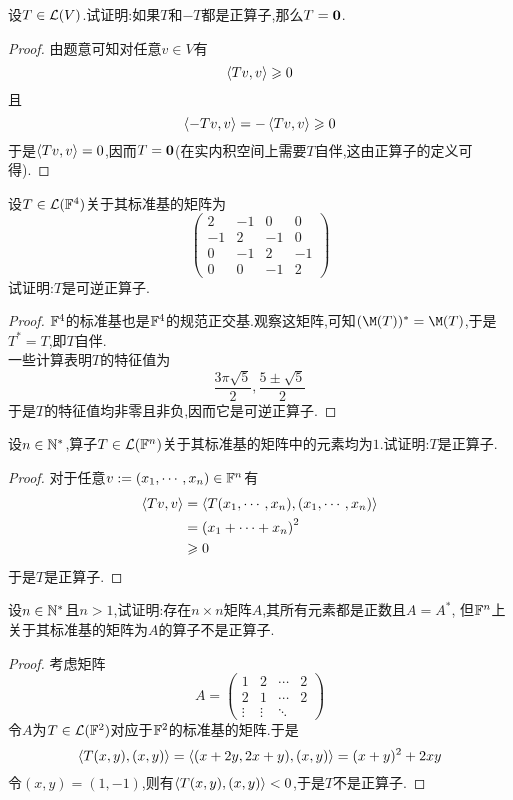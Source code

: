 \documentclass{ctexart}
\begin{document}
\pagestyle{empty}
\begin{center}
    \large{}
\end{center}
\begin{problem}[1.]
    设$T\in\mathcal{L}(V)$.试证明:如果$T$和$-T$都是正算子,那么$T=\mathbf0$.
\end{problem}
\begin{proof}
    由题意可知对任意$v\in V$有
    \[\left\langle{Tv},{v}\right\rangle\geqslant0\]
    且
    \[\left\langle{-Tv},{v}\right\rangle=-\left\langle{Tv},{v}\right\rangle\geqslant0\]
    于是$\left\langle{Tv},{v}\right\rangle=0$,因而$T=\mathbf0$(在实内积空间上需要$T$自伴,这由正算子的定义可得).
\end{proof}
\begin{problem}[2.]
    设$T\in\mathcal{L}(\mathbb{F}^4)$关于其标准基的矩阵为
    \[\begin{pmatrix}
        2&-1&0&0\\
        -1&2&-1&0\\
        0&-1&2&-1\\
        0&0&-1&2
    \end{pmatrix}\]
    试证明:$T$是可逆正算子.
\end{problem}
\begin{proof}
    $\mathbb{F}^4$的标准基也是$\mathbb{F}^4$的规范正交基.观察这矩阵,可知$(\M(T))^*=\M(T)$,于是$T^*=T$,即$T$自伴.\\
    一些计算表明$T$的特征值为
    \[\dfrac{3\pi\sqrt5}{2},\dfrac{5\pm\sqrt5}{2}\]
    于是$T$的特征值均非零且非负,因而它是可逆正算子.
\end{proof}
\begin{problem}[3.]
    设$n\in\mathbb{N}^*$,算子$T\in\mathcal{L}(\mathbb{F}^n)$关于其标准基的矩阵中的元素均为$1$.试证明:$T$是正算子.
\end{problem}
\begin{proof}
    对于任意$v:=({x}_1,\cdots,{x}_{n})\in\mathbb{F}^n$有
    \[\begin{aligned}
        \left\langle{Tv},{v}\right\rangle
        &= \left\langle{T({x}_1,\cdots,{x}_{n})},{({x}_1,\cdots,{x}_{n})}\right\rangle \\
        &= \left({x}_1+\cdots+{x}_{n}\right)^2 \\
        &\geqslant 0
    \end{aligned}\]
    于是$T$是正算子.
\end{proof}
\begin{problem}[4.]
    设$n\in\mathbb{N}^*$且$n>1$,试证明:存在$n\times n$矩阵$A$,其所有元素都是正数且$A=A^*$,%
    但$\mathbb{F}^n$上关于其标准基的矩阵为$A$的算子不是正算子.
\end{problem}
\begin{proof}
    考虑矩阵
    \[A=\begin{pmatrix}
        1&2&\cdots&2\\
        2&1&\cdots&2\\
        \vdots&\vdots&\ddots&
    \end{pmatrix}\]
    令$A$为$T\in\mathcal{L}(\mathbb{F}^2)$对应于$\mathbb{F}^2$的标准基的矩阵.于是
    \[\left\langle{T(x,y)},{(x,y)}\right\rangle
    =\left\langle{(x+2y,2x+y)},{(x,y)}\right\rangle
    =(x+y)^2+2xy\]
    令$(x,y)=(1,-1)$,则有$\left\langle{T(x,y)},{(x,y)}\right\rangle<0$,于是$T$不是正算子.
\end{proof}
\end{document}
